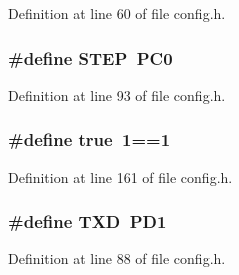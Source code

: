 Definition at line 60 of file config.\-h.

\hypertarget{group__biba__config_ga70be2dc5c8bdc85b027ea6118753cca1}{
\subsubsection[{S\-T\-E\-P}]{\setlength{\rightskip}{0pt plus 5cm}\#define S\-T\-E\-P~P\-C0}}\label{group__biba__config_ga70be2dc5c8bdc85b027ea6118753cca1}


Definition at line 93 of file config.\-h.

\hypertarget{group__biba__config_ga41f9c5fb8b08eb5dc3edce4dcb37fee7}{
\subsubsection[{true}]{\setlength{\rightskip}{0pt plus 5cm}\#define true~1==1}}\label{group__biba__config_ga41f9c5fb8b08eb5dc3edce4dcb37fee7}


Definition at line 161 of file config.\-h.

\hypertarget{group__biba__config_ga0466ccb605cb0395fb03b72f476ec855}{
\subsubsection[{T\-X\-D}]{\setlength{\rightskip}{0pt plus 5cm}\#define T\-X\-D~P\-D1}}\label{group__biba__config_ga0466ccb605cb0395fb03b72f476ec855}


Definition at line 88 of file config.\-h.

